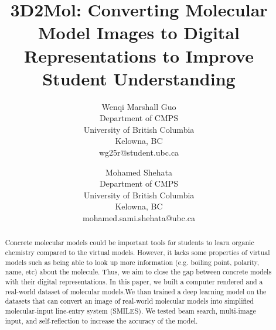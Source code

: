 \documentclass[12pt]{article}
\begin{document}
\title{3D2Mol: Converting Molecular Model Images to Digital Representations to Improve Student Understanding}


\author{Wenqi Marshall Guo\\
Department of CMPS\\
University of British Columbia\\
Kelowna, BC\\
wg25r@student.ubc.ca 
\and
Mohamed Shehata\\
Department of CMPS\\
University of British Columbia\\
Kelowna, BC\\
mohamed.sami.shehata@ubc.ca
}

\maketitle


\begin{abstract}
Concrete molecular models could be important tools for students to learn organic chemistry compared to the virtual models. However, it lacks some properties of virtual models such as being able to look up more information (e.g. boiling point, polarity, name, etc) about the molecule. Thus, we aim to close the gap between concrete models with their digital representations. In this paper, we built a computer rendered and a real-world dataset of molecular models.We than trained a deep learning model on the datasets that can convert an image of real-world molecular models into simplified molecular-input line-entry system (SMILES). We tested beam search, multi-image input, and self-reflection to increase the accuracy of the model. 

\end{abstract}
\end{document}
